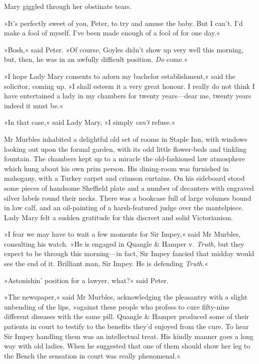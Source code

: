 Mary giggled through her obstinate tears.

»It's perfectly sweet of you, Peter, to try and amuse the baby. But I can't. I'd make a fool of myself. I've been made enough of a fool of for one day.«

»Bosh,« said Peter. »Of course, Goyles didn't show up very well this morning, but, then, he was in an awfully difficult position. \textit{Do} come.«

»I hope Lady Mary consents to adorn my bachelor establishment,« said the solicitor, coming up. »I shall esteem it a very great honour. I really do not think I have entertained a lady in my chambers for twenty years—dear me, twenty years indeed it must be.«

»In that case,« said Lady Mary, »I simply \textit{can't} refuse.«

Mr Murbles inhabited a delightful old set of rooms in Staple Inn, with windows looking out upon the formal garden, with its odd little flower-beds and tinkling fountain. The chambers kept up to a miracle the old-fashioned law atmosphere which hung about his own prim person.  His dining-room was furnished in mahogany, with a Turkey carpet and crimson curtains. On his sideboard stood some pieces of handsome Sheffield plate and a number of decanters with engraved silver labels round their necks. There was a bookcase full of large volumes bound in law calf, and an oil-painting of a harsh-featured judge over the mantelpiece. Lady Mary felt a sudden gratitude for this discreet and solid Victorianism.

»I fear we may have to wait a few moments for Sir Impey,« said Mr  Murbles, consulting his watch. »He is engaged in Quangle \& Hamper v.  \textit{Truth}, but they expect to be through this morning—in fact, Sir Impey fancied that midday would see the end of it. Brilliant man, Sir Impey.  He is defending \textit{Truth}.«

»Astonishin' position for a lawyer, what?« said Peter.

»The newspaper,« said Mr Murbles, acknowledging the pleasantry with a slight unbending of the lips, »against these people who profess to cure fifty-nine different diseases with the same pill. Quangle \& Hamper produced some of their patients in court to testify to the benefits they'd enjoyed from the cure. To hear Sir Impey handling them was an intellectual treat. His kindly manner goes a long way with old ladies.  When he suggested that one of them should show her leg to the Bench the sensation in court was really phenomenal.«

